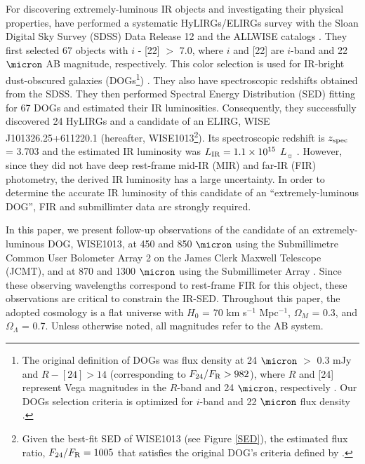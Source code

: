 \documentclass[twocolumn]{aastex6}
\begin{document}
For discovering extremely-luminous IR objects and investigating their physical properties, \cite{Toba_16} have performed a systematic HyLIRGs/ELIRGs survey with the Sloan Digital Sky Survey (SDSS) Data Release 12 \citep[DR12:][]{York,Alam} and the ALLWISE catalogs \citep{Cutri}.
They first selected 67 objects with $i$ - [22] $>$ 7.0, where $i$ and [22] are $i$-band and 22 $\micron$ AB magnitude, respectively.
This color selection is used for IR-bright dust-obscured galaxies (DOGs\footnote{The original definition of DOGs was flux density at 24 $\micron$ $>$ 0.3 mJy and $R - [24] > 14$ (corresponding to $F_{\rm 24}/F_{\rm R} > 982$), where $R$ and [24] represent Vega magnitudes in the $R$-band and 24 $\micron$, respectively \citep{Dey}. Our DOGs selection criteria is optimized for $i$-band and 22 $\micron$ flux density \cite[see][for more detail]{Toba}.}) \citep[e.g.,][]{Toba,Toba_17a,Toba_17d}.
They also have spectroscopic redshifts obtained from the SDSS.
They then performed Spectral Energy Distribution (SED) fitting for 67 DOGs and estimated their IR luminosities.
Consequently, they successfully discovered 24 HyLIRGs and a candidate of an ELIRG, WISE J101326.25+611220.1 (hereafter, WISE1013\footnote{Given the best-fit SED of WISE1013 (see Figure \ref{SED}), the estimated flux ratio, $F_{\rm 24}/F_{\rm R} = 1005$ that satisfies the original DOG's criteria defined by \cite{Dey}.}).
Its spectroscopic redshift is $z_{\rm spec}$ = 3.703 and the estimated IR luminosity was $L_{\rm IR} = 1.1 \times 10^{15}$ $L_{\sun}$ \citep[see lower-right panel of Figure 6, and bottom panel of Figure 8 in][]{Toba_16}.
However, since they did not have deep rest-frame mid-IR (MIR) and far-IR (FIR) photometry, the derived IR luminosity has a large uncertainty. 
In order to determine the accurate IR luminosity of this candidate of an ``extremely-luminous DOG'', FIR and submillimter data are strongly required.

In this paper, we present follow-up observations of the candidate of an extremely-luminous DOG, WISE1013,  at 450 and 850 $\micron$ using the Submillimetre Common User Bolometer Array 2 \citep[SCUBA-2: ][]{Holland} on the James Clerk Maxwell Telescope (JCMT), and at 870 and 1300 $\micron$ using the Submillimeter Array \citep[SMA: ][]{Ho}.
Since these observing wavelengths correspond to rest-frame FIR for this object, these observations are critical to constrain the IR-SED.
Throughout this paper, the adopted cosmology is a flat universe with $H_0$ = 70 km s$^{-1}$ Mpc$^{-1}$, $\Omega_M$ = 0.3, and $\Omega_{\Lambda}$ = 0.7. Unless otherwise noted, all magnitudes refer to the AB system. 
\end{document}
